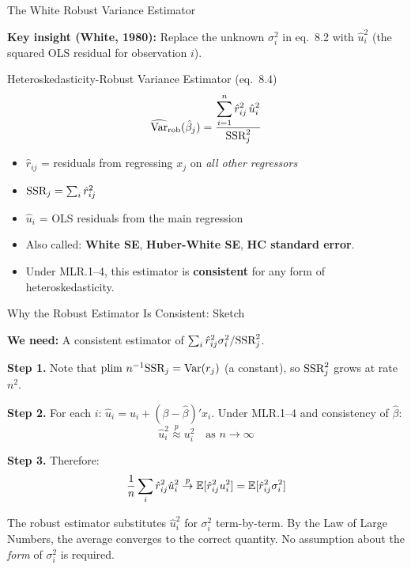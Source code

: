 \documentclass[aspectratio=169, 12pt]{beamer}
\begin{document}
\begin{frame}{The White Robust Variance Estimator}

  \textbf{Key insight (White, 1980):} Replace the unknown $\sigma_i^2$ in eq.\ 8.2 with $\hat{u}_i^2$ (the squared OLS residual for observation $i$).

  \smallskip

  \begin{definitionbox}{Heteroskedasticity-Robust Variance Estimator (eq.\ 8.4)}
    \[
      \widehat{\operatorname{Var}}_{\text{rob}}(\hat{\beta}_j) = \frac{\displaystyle\sum_{i=1}^n \hat{r}_{ij}^2 \, \hat{u}_i^2}{\text{SSR}_j^2}
    \]
    \begin{itemize}
      \item $\hat{r}_{ij}$ = residuals from regressing $x_j$ on \textit{all other regressors}
      \item $\text{SSR}_j = \sum_i \hat{r}_{ij}^2$
      \item $\hat{u}_i$ = OLS residuals from the main regression
    \end{itemize}
  \end{definitionbox}

  \smallskip

  \begin{itemize}
    \item Also called: \textbf{White SE}, \textbf{Huber-White SE}, \textbf{HC standard error}.
    \item Under MLR.1--4, this estimator is \textbf{consistent} for any form of heteroskedasticity.
  \end{itemize}

\end{frame}

\begin{frame}{Why the Robust Estimator Is Consistent: Sketch}

  \textbf{We need:} A consistent estimator of $\sum_i \hat{r}_{ij}^2 \sigma_i^2 / \text{SSR}_j^2$.

  \smallskip

  \textbf{Step 1.} Note that $\operatorname{plim}\, n^{-1}\text{SSR}_j = \operatorname{Var}(r_j)$ (a constant), so $\text{SSR}_j^2$ grows at rate $n^2$.

  \smallskip

  \textbf{Step 2.} For each $i$: $\hat{u}_i = u_i + (\beta - \hat{\beta})' x_i$. Under MLR.1--4 and consistency of $\hat{\beta}$:
  \[
    \hat{u}_i^2 \overset{p}{\approx} u_i^2 \quad \text{as } n \to \infty
  \]

  \smallskip

  \textbf{Step 3.} Therefore:
  \[
    \frac{1}{n}\sum_i \hat{r}_{ij}^2 \hat{u}_i^2
    \overset{p}{\to}
    \operatorname{\mathbb{E}}[\hat{r}_{ij}^2 u_i^2] = \operatorname{\mathbb{E}}[\hat{r}_{ij}^2 \sigma_i^2]
  \]

  \begin{keybox}
    The robust estimator substitutes $\hat{u}_i^2$ for $\sigma_i^2$ term-by-term. By the Law of Large Numbers, the average converges to the correct quantity. No assumption about the \textit{form} of $\sigma_i^2$ is required.
  \end{keybox}

\end{frame}
\end{document}
